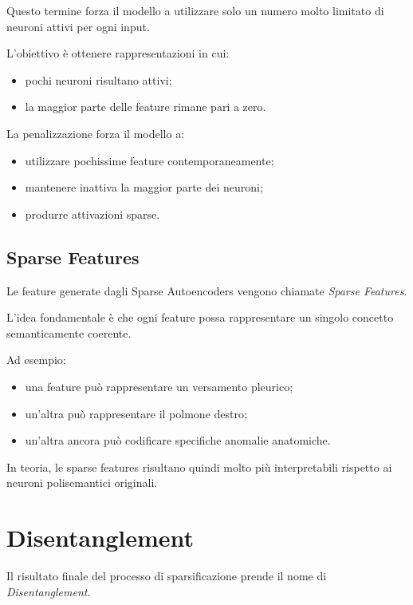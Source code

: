 Questo termine forza il modello a utilizzare solo un numero molto limitato di neuroni attivi per ogni input.

L'obiettivo è ottenere rappresentazioni in cui:

\begin{itemize}
    \item pochi neuroni risultano attivi;
    \item la maggior parte delle feature rimane pari a zero.
\end{itemize}

La penalizzazione forza il modello a:

\begin{itemize}
    \item utilizzare pochissime feature contemporaneamente;
    \item mantenere inattiva la maggior parte dei neuroni;
    \item produrre attivazioni sparse.
\end{itemize}

\subsection{Sparse Features}

Le feature generate dagli Sparse Autoencoders vengono chiamate \textit{Sparse Features}.

L'idea fondamentale è che ogni feature possa rappresentare un singolo concetto semanticamente coerente.

Ad esempio:

\begin{itemize}
    \item una feature può rappresentare un versamento pleurico;
    \item un'altra può rappresentare il polmone destro;
    \item un'altra ancora può codificare specifiche anomalie anatomiche.
\end{itemize}

In teoria, le sparse features risultano quindi molto più interpretabili rispetto ai neuroni polisemantici originali.

\section{Disentanglement}

Il risultato finale del processo di sparsificazione prende il nome di \textit{Disentanglement}.

